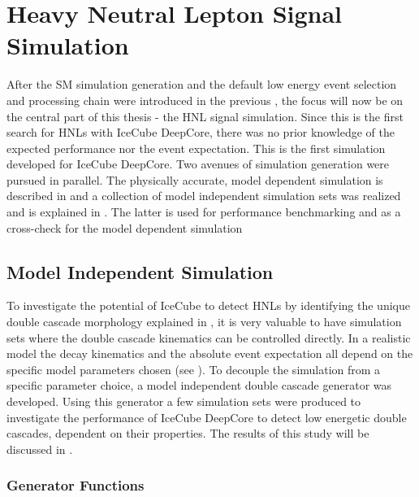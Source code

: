 \setchapterpreamble[u]{\margintoc}

\chapter{Heavy Neutral Lepton Signal Simulation}


After the SM simulation generation and the default low energy event selection and processing chain were introduced in the previous , the focus will now be on the central part of this thesis - the HNL signal simulation. Since this is the first search for HNLs with IceCube DeepCore, there was no prior knowledge of the expected performance nor the event expectation. This is the first simulation developed for IceCube DeepCore. Two avenues of simulation generation were pursued in parallel. The physically accurate, model dependent simulation is described in  and a collection of model independent simulation sets was realized and is explained in . The latter is used for performance benchmarking and as a cross-check for the model dependent simulation


\section{Model Independent Simulation} 

To investigate the potential of IceCube to detect HNLs by identifying the unique double cascade morphology explained in , it is very valuable to have simulation sets where the double cascade kinematics can be controlled directly. In a realistic model the decay kinematics and the absolute event expectation all depend on the specific model parameters chosen (see ). To decouple the simulation from a specific parameter choice, a model independent double cascade generator was developed. Using this generator a few simulation sets were produced to investigate the performance of IceCube DeepCore to detect low energetic double cascades, dependent on their properties. The results of this study will be discussed in .


\subsection{Generator Functions}

